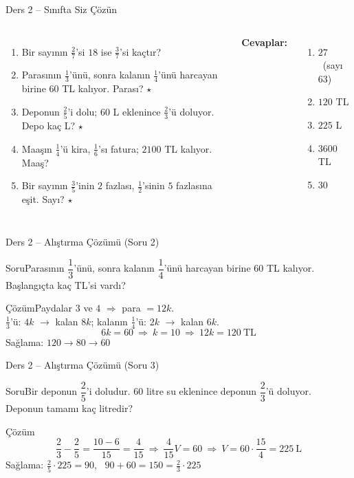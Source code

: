\documentclass[aspectratio=169,11pt,handout]{beamer}
\newcommand{\soru}[3]{%
\begin{frame}{#1}
  \begin{block}{Soru}\large #2\end{block}
  \pause
  \begin{exampleblock}{Çözüm}\large #3\end{exampleblock}
\end{frame}}
\begin{document}
\begin{frame}{Ders 2 -- Sınıfta Siz Çözün}
\begin{columns}[t]
\begin{enumerate}
\item Bir sayının \(\frac{2}{7}\)'si \(18\) ise \(\frac{3}{7}\)'si kaçtır?
\item Parasının \(\frac{1}{3}\)'ünü, sonra kalanın \(\frac{1}{4}\)'ünü harcayan birine \(60\) TL kalıyor. Parası? \(\star\)
\item Deponun \(\frac{2}{5}\)'i dolu; \(60\) L eklenince \(\frac{2}{3}\)'ü doluyor. Depo kaç L? \(\star\)
\item Maaşın \(\frac{1}{4}\)'ü kira, \(\frac{1}{6}\)'sı fatura; \(2100\) TL kalıyor. Maaş?
\item Bir sayının \(\frac{3}{5}\)'inin \(2\) fazlası, \(\frac{1}{2}\)'sinin \(5\) fazlasına eşit. Sayı? \(\star\)
\end{enumerate}
\pause
\textbf{Cevaplar:}
\begin{enumerate}
\item \(27\) \ (sayı \(63\))
\item \(120\) TL
\item \(225\) L
\item \(3600\) TL
\item \(30\)
\end{enumerate}
\end{columns}
\vspace{4pt}{\footnotesize \(\star\) işaretli soruların adım adım çözümü sonraki slaytlardadır.}
\end{frame}

\soru{Ders 2 -- Alıştırma Çözümü (Soru 2)}
{Parasının \(\dfrac{1}{3}\)'ünü, sonra kalanın \(\dfrac{1}{4}\)'ünü harcayan birine \(60\) TL kalıyor. Başlangıçta kaç TL'si vardı?}
{Paydalar \(3\) ve \(4\) \(\Rightarrow\) para \(=12k\).\\[2pt]
\(\frac{1}{3}\)'ü: \(4k\) \(\to\) kalan \(8k\); \quad kalanın \(\frac{1}{4}\)'ü: \(2k\) \(\to\) kalan \(6k\).
\[6k=60\ \Rightarrow\ k=10\ \Rightarrow\ 12k=120\ \text{TL}\]
Sağlama: \(120\to 80\to 60\) \checkmark}

\soru{Ders 2 -- Alıştırma Çözümü (Soru 3)}
{Bir deponun \(\dfrac{2}{5}\)'i doludur. \(60\) litre su eklenince deponun \(\dfrac{2}{3}\)'ü doluyor. Deponun tamamı kaç litredir?}
{\[\frac{2}{3}-\frac{2}{5}=\frac{10-6}{15}=\frac{4}{15}\ \Rightarrow\ \frac{4}{15}V=60\ \Rightarrow\ V=60\cdot\frac{15}{4}=225\ \text{L}\]
Sağlama: \(\frac{2}{5}\cdot 225=90\), \ \(90+60=150=\frac{2}{3}\cdot 225\) \checkmark}
\end{document}
